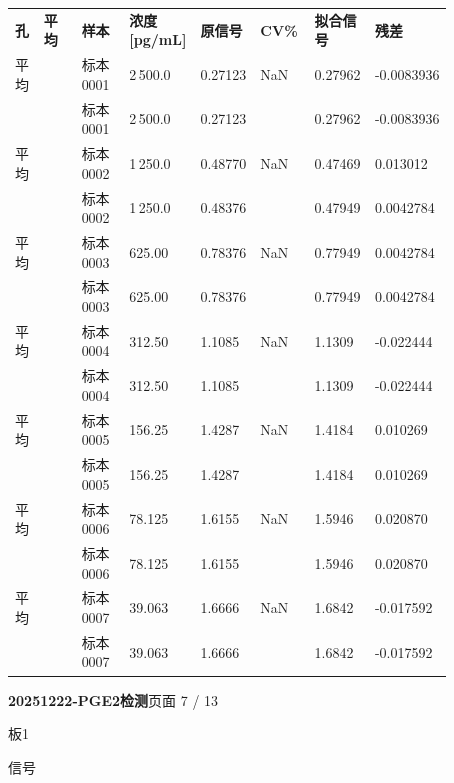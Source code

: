 \documentclass[UTF8,10pt,a4paper,fontset=fandol]{ctexart}
\begin{document}
\small
\begin{tabular}{p{0.07\linewidth}p{0.14\linewidth}p{0.14\linewidth}p{0.14\linewidth}p{0.10\linewidth}p{0.14\linewidth}p{0.14\linewidth}l}
\textbf{孔} & \textbf{平均} & \textbf{样本} & \textbf{浓度 [pg/mL]} & \textbf{原信号} & \textbf{CV\%} & \textbf{拟合信号} & \textbf{残差}\\
平均 &  & 标本0001 & 2\,500.0 & 0.27123 & NaN & 0.27962 & -0.0083936\\
 &  & 标本0001 & 2\,500.0 & 0.27123 &  & 0.27962 & -0.0083936\\
平均 &  & 标本0002 & 1\,250.0 & 0.48770 & NaN & 0.47469 & 0.013012\\
 &  & 标本0002 & 1\,250.0 & 0.48376 &  & 0.47949 & 0.0042784\\
平均 &  & 标本0003 & 625.00 & 0.78376 & NaN & 0.77949 & 0.0042784\\
 &  & 标本0003 & 625.00 & 0.78376 &  & 0.77949 & 0.0042784\\
平均 &  & 标本0004 & 312.50 & 1.1085 & NaN & 1.1309 & -0.022444\\
 &  & 标本0004 & 312.50 & 1.1085 &  & 1.1309 & -0.022444\\
平均 &  & 标本0005 & 156.25 & 1.4287 & NaN & 1.4184 & 0.010269\\
 &  & 标本0005 & 156.25 & 1.4287 &  & 1.4184 & 0.010269\\
平均 &  & 标本0006 & 78.125 & 1.6155 & NaN & 1.5946 & 0.020870\\
 &  & 标本0006 & 78.125 & 1.6155 &  & 1.5946 & 0.020870\\
平均 &  & 标本0007 & 39.063 & 1.6666 & NaN & 1.6842 & -0.017592\\
 &  & 标本0007 & 39.063 & 1.6666 &  & 1.6842 & -0.017592
\end{tabular}
\normalsize

\newpage

\begin{center}
\textbf{20251222-PGE2检测}\hfill 页面 7 / 13
\end{center}

\noindent
板1

\noindent
信号
\end{document}

